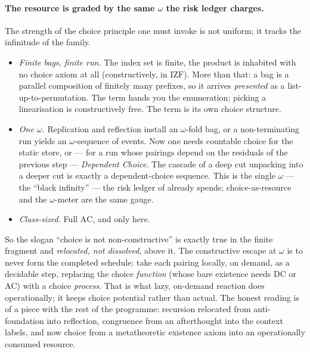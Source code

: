 \documentclass[11pt]{article}
\theoremstyle{definition}
\theoremstyle{plain}
\theoremstyle{remark}
\begin{document}
\paragraph{The resource is graded by the same $\omega$ the risk ledger charges.}
The strength of the choice principle one must invoke is not uniform; it tracks
the infinitude of the family.

\begin{itemize}[leftmargin=1.4em]
\item \emph{Finite bags, finite run.} The index set is finite, the product is
inhabited with no choice axiom at all (constructively, in $\mathrm{IZF}$). More
than that: a bag is a parallel composition of finitely many prefixes, so it
arrives \emph{presented} as a list-up-to-permutation. The term hands you the
enumeration; picking a linearisation is constructively free. The term is its own
choice structure.

\item \emph{One $\omega$.} Replication and reflection install an $\omega$-fold
bag, or a non-terminating run yields an $\omega$-sequence of events. Now one needs
countable choice for the static store, or --- for a run whose pairings depend on
the residuals of the previous step --- \emph{Dependent Choice}. The cascade of a
deep cut unpacking into a deeper cut \cite{paths} is exactly a dependent-choice
sequence. This is the single $\omega$ --- the ``black infinity'' --- the risk
ledger of \cite{qcs} already spends; choice-as-resource and the $\omega$-meter
are the same gauge.

\item \emph{Class-sized.} Full $\mathrm{AC}$, and only here.
\end{itemize}

\noindent
So the slogan ``choice is not non-constructive'' is exactly true in the finite
fragment and \emph{relocated, not dissolved}, above it. The constructive escape
at $\omega$ is to never form the completed schedule: take each pairing locally, on
demand, as a decidable step, replacing the choice \emph{function} (whose bare
existence needs $\mathrm{DC}$ or $\mathrm{AC}$) with a choice \emph{process}. That
is what lazy, on-demand reaction does operationally; it keeps choice potential
rather than actual. The honest reading is of a piece with the rest of the
programme: recursion relocated from anti-foundation into reflection, congruence
from an afterthought into the context labels, and now choice from a metatheoretic
existence axiom into an operationally consumed resource.
\end{document}
